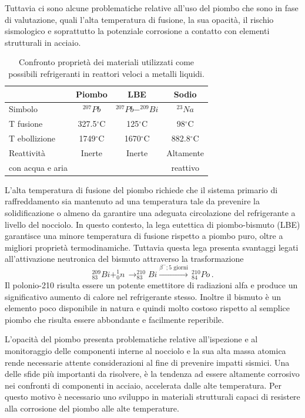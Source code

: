 Tuttavia ci sono alcune problematiche relative all'uso del piombo che sono in 
fase di valutazione, quali l'alta temperatura di 
fusione, 
la sua opacità, il rischio sismologico e soprattutto la potenziale corrosione 
a 
contatto con elementi strutturali in acciaio. 
\begin{table}[!htb]
 \centering
\begin{tabular}{lccc}
\toprule
 & Piombo & LBE & Sodio \\
\midrule
 Simbolo & $^{207}Pb$ & $^{207}Pb-^{209}Bi$ & $^{23}Na$ \\

 T fusione & 327.5$^\circ$C & 125$^\circ$C & 98$^\circ$C\\
 T ebollizione & 1749$^\circ$C &  1670$^\circ$C &882.8$^\circ$C\\
 Reattività  & Inerte & Inerte & Altamente  \\
 con acqua e aria & & & reattivo \\
\bottomrule
\end{tabular}
\caption{Confronto proprietà dei materiali utilizzati come possibili 
refrigeranti in reattori veloci a metalli liquidi. \label{pb}}
\end{table}

L'alta temperatura di fusione del piombo richiede che il sistema primario di 
raffreddamento sia mantenuto ad una temperatura tale da prevenire la 
solidificazione o almeno da garantire una adeguata circolazione del 
refrigerante 
a livello del nocciolo.
In questo contesto, la lega eutettica di piombo-bismuto (LBE) garantisce una 
minore temperatura di fusione rispetto a piombo puro, oltre a migliori 
proprietà 
termodinamiche. Tuttavia questa lega presenta svantaggi legati all'attivazione 
neutronica del bismuto attraverso la trasformazione
\begin{equation}
^{209}_{83}Bi + ^{1}_{0}n \, \longrightarrow ^{210}_{83}Bi  \xrightarrow{\beta^- 
; \text{5 giorni}} \, ^{210}_{84}Po  \,.
\end{equation}
Il polonio-210 risulta essere un potente emettitore di radiazioni alfa e produce 
un significativo aumento di calore nel refrigerante stesso.
Inoltre il bismuto è un elemento poco disponibile in natura e quindi molto 
costoso rispetto al semplice piombo che risulta essere abbondante e facilmente 
reperibile.

L'opacità del piombo presenta problematiche relative all'ispezione e al 
monitoraggio delle componenti interne al nocciolo e la sua alta massa atomica 
rende necessarie attente considerazioni al fine di prevenire impatti sismici.
Una delle sfide più importanti da risolvere, è la tendenza ad essere 
altamente corrosivo nei confronti di componenti in acciaio, accelerata dalle 
alte temperatura. Per questo motivo è necessario uno sviluppo in materiali 
strutturali capaci di resistere alla corrosione del piombo alle alte 
temperature.

